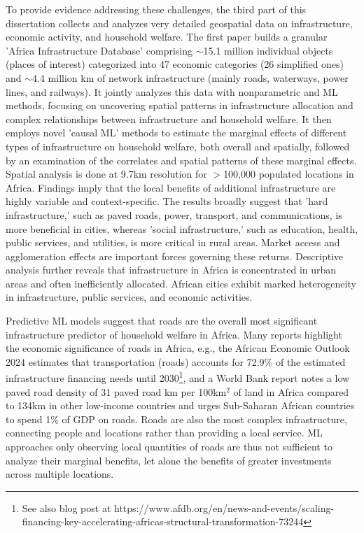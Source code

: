 \documentclass[a4paper]{article}
\begin{document}
To provide evidence addressing these challenges, the third part of this dissertation collects and analyzes very detailed geospatial data on infrastructure, economic activity, and household welfare. The first paper \citep{krantz2023mapping} builds a granular 'Africa Infrastructure Database' comprising $\sim$15.1 million individual objects (places of interest) categorized into 47 economic categories (26 simplified ones) and $\sim$4.4 million km of network infrastructure (mainly roads, waterways, power lines, and railways). It jointly analyzes this data with nonparametric and ML methods, focusing on uncovering spatial patterns in infrastructure allocation and complex relationships between infrastructure and household welfare. It then employs novel 'causal ML' methods to estimate the marginal effects of different types of infrastructure on household welfare, both overall and spatially, followed by an examination of the correlates and spatial patterns of these marginal effects. Spatial analysis is done at 9.7km resolution for $>$100,000 populated locations in Africa. Findings imply that the local benefits of additional infrastructure are highly variable and context-specific. The results broadly suggest that 'hard infrastructure,' such as paved roads, power, transport, and communications, is more beneficial in cities, whereas 'social infrastructure,' such as education, health, public services, and utilities, is more critical in rural areas. Market access and agglomeration effects are important forces governing these returns. Descriptive analysis further reveals that infrastructure in Africa is concentrated in urban areas and often inefficiently allocated. African cities exhibit marked heterogeneity in infrastructure, public services, and economic activities. \newline 

Predictive ML models suggest that roads are the overall most significant infrastructure predictor of household welfare in Africa. Many reports highlight the economic significance of roads in Africa, e.g., the African Economic Outlook 2024 \citep{african2024driving} estimates that transportation (roads) accounts for 72.9\% of the estimated infrastructure financing needs until 2030\footnote{See also blog post at https://www.afdb.org/en/news-and-events/scaling-financing-key-accelerating-africas-structural-transformation-73244}, and a World Bank report \citep{foster2010africa} notes a low paved road density of 31 paved road km per 100km$^2$ of land in Africa compared to 134km in other low-income countries and urges Sub-Saharan African countries to spend 1\% of GDP on roads. Roads are also the most complex infrastructure, connecting people and locations rather than providing a local service. ML approaches only observing local quantities of roads are thus not sufficient to analyze their marginal benefits, let alone the benefits of greater investments across multiple locations. \newline
\end{document}
